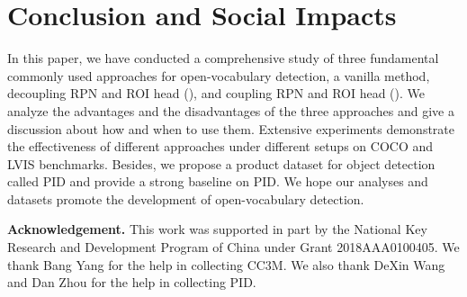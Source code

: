 \documentclass[sigconf]{acmart}
\begin{document}
\section{Conclusion and Social Impacts}
\label{conclusion}
In this paper, we have conducted a comprehensive study of three fundamental commonly used approaches for open-vocabulary detection, a vanilla method, decoupling RPN and ROI head (), and coupling RPN and ROI head (). We analyze the advantages and the disadvantages of the three approaches and give a discussion about how and when to use them. Extensive experiments demonstrate the effectiveness of different approaches under different setups on COCO and LVIS benchmarks. Besides, we propose a product dataset for object detection called PID and provide a strong baseline on PID. We hope our analyses and datasets promote the development of open-vocabulary detection.

\textbf{Acknowledgement.} This work was supported in part by the National Key Research and Development Program of China under Grant 2018AAA0100405. We thank Bang Yang for the help in collecting CC3M. We also thank DeXin Wang and Dan Zhou for the help in collecting PID.




% 
% 








\end{document}
